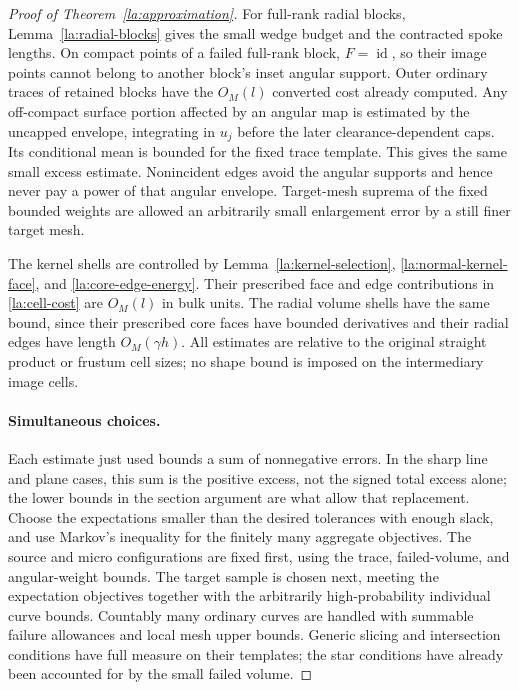 \documentclass[11pt]{article}
\numberwithin{equation}{section}
\theoremstyle{definition}
\theoremstyle{remark}
\begin{document}
\begin{proof}[Proof of Theorem~\ref{la:approximation}]
For full-rank radial blocks, Lemma~\ref{la:radial-blocks} gives the
small wedge budget and the contracted spoke lengths.  On compact
points of a failed full-rank block, $F=\operatorname{id}$, so their image points
cannot belong to another block's inset angular support.  Outer
ordinary traces of retained blocks have the $O_M(l)$ converted cost
already computed.  Any off-compact surface portion affected by an
angular map is estimated by the uncapped envelope, integrating in
$u_j$ before the later clearance-dependent caps.  Its conditional
mean is bounded for the fixed trace template.  This gives the same
small excess estimate.  Nonincident edges avoid the angular
supports and hence never pay a power of that angular envelope.
Target-mesh suprema of the fixed bounded weights are allowed an
arbitrarily small enlargement error by a still finer target mesh.

The kernel shells are controlled by
Lemma~\ref{la:kernel-selection},
\eqref{la:normal-kernel-face}, and
\eqref{la:core-edge-energy}.  Their prescribed face and edge
contributions in \eqref{la:cell-cost} are $O_M(l)$ in bulk units.
The radial volume shells have the same bound, since their prescribed
core faces have bounded derivatives and their radial edges have
length $O_M(\gamma h)$.  All estimates are relative to the original
straight product or frustum cell sizes; no shape bound is imposed
on the intermediary image cells.

\paragraph{Simultaneous choices.}
Each estimate just used bounds a sum of nonnegative errors.  In the
sharp line and plane cases, this sum is the positive excess, not the
signed total excess alone; the lower bounds in the section argument
are what allow that replacement.  Choose the expectations smaller
than the desired tolerances with enough slack, and use Markov's
inequality for the finitely many aggregate objectives.  The source
and micro configurations are fixed first, using the trace,
failed-volume, and angular-weight bounds.  The target sample is
chosen next, meeting the expectation objectives together with the
arbitrarily high-probability individual curve bounds.  Countably
many ordinary curves are handled with summable failure allowances
and local mesh upper bounds.  Generic slicing and intersection
conditions have full measure on their templates; the star conditions
have already been accounted for by the small failed volume.


\end{proof}
\end{document}
